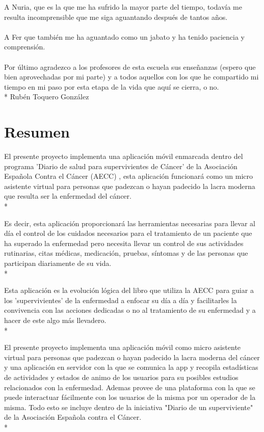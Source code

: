 \documentclass[b5paper,10pt,twoside]{book}
\begin{document}
{		A Nuria, que es la que me ha sufrido la mayor parte del tiempo, todavía me resulta incomprensible que me siga aguantando después de tantos años.\\\\
		A Fer que también me ha aguantado como un jabato y ha tenido paciencia y comprensión.\\\\
		Por último agradezco a los profesores de esta escuela sus enseñanzas (espero que bien aprovechadas por mi parte) y a todos aquellos con los que he compartido mi tiempo en mi paso por esta etapa de la vida que aquí se cierra, o no.\\*
		Rubén Toquero González} 
	

	\chapter*{Resumen}
		El presente proyecto implementa una aplicación móvil enmarcada dentro del programa 'Diario de salud para supervivientes de Cáncer' de la Asociación Española Contra el Cáncer (AECC) \cite{aecc}, esta aplicación funcionará como un micro asistente virtual para personas que padezcan o hayan padecido la lacra moderna que resulta ser la enfermedad del cáncer.\\*
		
		Es decir, esta aplicación proporcionará las herramientas necesarias para llevar al día el control de los cuidados necesarios para el tratamiento de un paciente que ha superado la enfermedad pero necesita llevar un control de sus actividades rutinarias, citas médicas, medicación, pruebas, síntomas y de las personas que participan diariamente de su vida.\\*
		
		Esta aplicación es la evolución lógica del libro que utiliza la AECC para guiar a los 'supervivientes' de la enfermedad a enfocar su día a día y facilitarles la convivencia con las acciones dedicadas o no al tratamiento de su enfermedad y a hacer de este algo más llevadero.\\*
		
		El presente proyecto implementa una aplicación móvil como micro asistente virtual para personas que padezcan o hayan padecido la lacra moderna del cáncer y una aplicación en servidor con la que se comunica la app y recopila estadísticas de actividades y estados de animo de los usuarios para su posibles estudios relacionados con la enfermedad. Ademas provee de una plataforma con la que se puede interactuar fácilmente con los usuarios de la misma por un operador de la misma. Todo esto se incluye dentro de la iniciativa "Diario de un superviviente" de la Asociación Española contra el Cáncer.\\*
	 	
\end{document}
